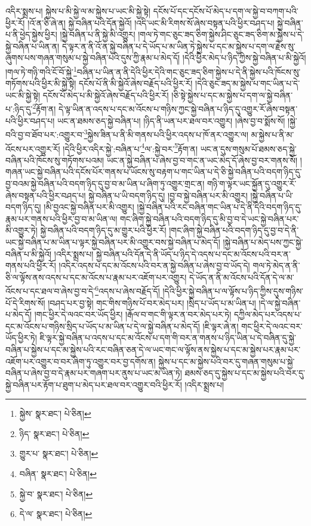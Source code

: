 འདིར་སྨྲས་པ། སྐྱེས་པ་མི་སྐྱེ་ལ་མ་སྐྱེས་པ་ཡང་མི་སྐྱེ་སྟེ། དངོས་པོ་དང་དངོས་པོ་མེད་པ་དག་ལ་སྐྱེ་བ་བཀག་པའི་ཕྱིར་རོ། །འོ་ན་ཅི་ཞེ་ན། སྐྱེ་བཞིན་པའི་དོན་སྐྱེའོ། །འདི་ཡང་མི་རིགས་སོ་ཞེས་བསྟན་པའི་ཕྱིར་བཤད་པ། སྐྱེ་བཞིན་པ་ནི་ཕྱེད་སྐྱེས་ཕྱིར། །སྐྱེ་བཞིན་པ་ནི་སྐྱེ་མི་འགྱུར། །གལ་ཏེ་གང་ཅུང་ཟད་ཅིག་སྐྱེས་ཤིང་ཅུང་ཟད་ཅིག་མ་སྐྱེས་པ་དེ་སྐྱེ་བཞིན་པ་ཡིན་ན། དེ་ལྟར་ན་ནི་འོ་ན་སྐྱེ་བཞིན་པ་དེ་ཡོད་པ་མ་ཡིན་ཏེ་སྐྱེས་པ་དང་མ་སྐྱེས་པ་དག་ལ་རྗེས་སུ་ཞུགས་པས་གཞན་གསུམ་པ་སྐྱེ་བཞིན་པའི་དུས་ཀྱི་རྣམ་པ་མེད་དོ། །དེའི་ཕྱིར་མེད་པ་ཉིད་ཀྱིས་སྐྱེ་བཞིན་པ་མི་སྐྱེའོ། །གལ་ཏེ་གཉི་གའི་ངོ་བོ་སྐྱེ་\footnote{སྐྱེས་  སྣར་ཐང་།  པེ་ཅིན། }བཞིན་པ་ཡིན་ན་ནི་དེའི་ཕྱིར་དེའི་གང་ཅུང་ཟད་ཅིག་སྐྱེས་པ་དེ་ནི་སྐྱེས་པའི་ཁོངས་སུ་གཏོགས་པའི་ཕྱིར་མི་སྐྱེ་སྟེ། དངོས་པོ་ནི་མི་སྐྱེའོ་ཞེས་བརྗོད་པའི་ཕྱིར་རོ། །དེའི་ཅུང་ཟད་མ་སྐྱེས་པ་གང་ཡིན་པ་དེ་ཡང་མི་སྐྱེ་སྟེ། དངོས་པོ་མེད་པ་མི་སྐྱེའོ་ཞེས་བརྗོད་པའི་ཕྱིར་རོ། །ཅི་སྟེ་སྐྱེས་པ་དང་མ་སྐྱེས་པ་དག་ལ་སྐྱེ་བཞིན་པ་:ཉིད་དུ་\footnote{ཉིད་  སྣར་ཐང་།  པེ་ཅིན། }རྟོག་ན། དེ་ལྟ་ཡིན་ན་འདས་པ་དང་མ་འོངས་པ་གཉིས་ཀྱང་སྐྱེ་བཞིན་པ་ཉིད་དུ་འགྱུར་རོ་ཞེས་བསྟན་པའི་ཕྱིར་བཤད་པ། ཡང་ན་ཐམས་ཅད་སྐྱེ་བཞིན་པ། །ཉིད་ནི་ཡན་པར་ཐལ་བར་འགྱུར། །ཞེས་བྱ་བ་སྨོས་སོ། །སྐྱེ་བའི་བྱ་བ་ཐོབ་པར་:འགྱུར་བ་\footnote{གྱུར་པ་  སྣར་ཐང་།  པེ་ཅིན། }སྐྱེས་ཟིན་པ་ནི་མི་གནས་པའི་ཕྱིར་འདས་པ་ཁོ་ནར་འགྱུར་ལ། མ་སྐྱེས་པ་ནི་མ་འོངས་པར་འགྱུར་རོ། །དེའི་ཕྱིར་འདིར་སྐྱེ་:བཞིན་པ་\footnote{བཞིན་  སྣར་ཐང་།  པེ་ཅིན། }ལ་:སྐྱེ་བར་\footnote{སྐྱེ་བ་  སྣར་ཐང་།  པེ་ཅིན། }རྟོག་ན། ཡང་ན་དུས་གསུམ་པོ་ཐམས་ཅད་སྐྱེ་བཞིན་པའི་ཁོངས་སུ་གཏོགས་པའམ། ཡང་ན་སྐྱེ་བཞིན་པ་ཞེས་བྱ་བ་གང་ན་ཡང་མེད་དོ་ཞེས་བྱ་བར་གནས་སོ། །གཞན་ཡང་སྐྱེ་བཞིན་པའི་དངོས་པོར་གནས་པ་ཡོངས་སུ་བརྟག་པ་གང་ཡིན་པ་དེ་ཅི་སྐྱེ་བཞིན་པའི་བདག་ཉིད་དུ་བྱ་བའམ་སྐྱེ་བཞིན་པའི་བདག་ཉིད་དུ་བྱ་བ་མ་ཡིན་པ་ཞིག་ཏུ་འགྱུར་གྲང་ན། གཉི་ག་ལྟར་ཡང་སྐྱོན་དུ་འགྱུར་རོ་ཞེས་བསྟན་པའི་ཕྱིར་བཤད་པ། སྐྱེ་བཞིན་པ་ཡི་བདག་ཉིད་དུ། །བྱ་བ་སྐྱེ་བཞིན་པར་མི་འགྱུར། །སྐྱེ་བཞིན་པ་ཡི་བདག་ཉིད་དུ། །མི་བྱའང་སྐྱེ་བཞིན་པར་མི་འགྱུར། །སྐྱེ་བཞིན་པའི་རང་བཞིན་གང་ཡིན་པ་དེ་ནི་དེའི་བདག་ཉིད་དུ་རྣམ་པར་གནས་པའི་ཕྱིར་བྱ་བ་མ་ཡིན་ལ། གང་ཞིག་སྐྱེ་བཞིན་པའི་བདག་ཉིད་དུ་མི་བྱ་བ་དེ་ཡང་སྐྱེ་བཞིན་པར་མི་འགྱུར་ཏེ། སྐྱེ་བཞིན་པའི་བདག་ཉིད་དུ་མ་གྱུར་པའི་ཕྱིར་རོ། །གང་ཞིག་སྐྱེ་བཞིན་པའི་བདག་ཉིད་དུ་བྱ་བ་དེ་ནི་ཡང་སྐྱེ་བཞིན་པ་མ་ཡིན་པ་ལྟར་སྐྱེ་བཞིན་པར་མི་འགྱུར་བས་སྐྱེ་བཞིན་པ་མེད་དོ། །སྐྱེ་བཞིན་པ་མེད་པས་ཀྱང་སྐྱེ་བཞིན་པ་མི་སྐྱེའོ། །འདིར་སྨྲས་པ། སྐྱེ་བཞིན་པའི་དོན་དེ་ནི་ཡོད་པ་ཉིད་དེ་འདས་པ་དང་མ་འོངས་པའི་བར་ན་གནས་པའི་ཕྱིར་རོ། །འདིར་འདས་པ་དང་མ་འོངས་པའི་བར་ན་སྐྱེ་བཞིན་པ་ཞེས་བྱ་བ་ཡོད་དེ། གལ་ཏེ་མེད་ན་ནི་ཅི་ལ་ལྟོས་ནས་འདས་པ་དང་མ་འོངས་པ་རྣམ་པར་འཇོག་པར་འགྱུར། དེ་ཡོད་ན་ནི་མ་འོངས་པའི་དོན་དེ་ལ་མ་འོངས་པ་དང་ཐལ་བ་ཞེས་བྱ་བ་དེ་\footnote{དེ་ལ་  སྣར་ཐང་།  པེ་ཅིན། }འདས་པ་ཞེས་བརྗོད་དོ། །དེའི་ཕྱིར་སྐྱེ་བཞིན་པ་ལ་ལྟོས་པ་ཉིད་ཀྱིས་དུས་གཉིས་པོ་དེ་རིགས་སོ། །བཤད་པར་བྱ་སྟེ། གང་གིས་གཉིས་པོ་བར་མེད་པར། །སྲིད་པ་ཡོད་པ་མ་ཡིན་པ། །དེ་ལ་སྐྱེ་བཞིན་པ་མེད་དོ། །གང་ཕྱིར་དེ་ལའང་བར་ཡོད་ཕྱིར། །རྒོལ་བ་གང་གི་ལྟར་ན་བར་མེད་པར་ཏེ། དཀྱིལ་མེད་པར་འདས་པ་དང་མ་འོངས་པ་གཉིས་སྲིད་པ་ཡོད་པ་མ་ཡིན་པ་དེ་ལ་སྐྱེ་བཞིན་པ་མེད་དོ། །ཇི་ལྟར་ཞེ་ན། གང་ཕྱིར་དེ་ལའང་བར་ཡོད་ཕྱིར་ཏེ། ཇི་ལྟར་སྐྱེ་བཞིན་པ་འདས་པ་དང་མ་འོངས་པ་དག་གི་བར་ན་གནས་པ་ཉིད་ཡིན་པ་དེ་བཞིན་དུ་སྐྱེ་བཞིན་པ་སྐྱེས་པ་དང་མ་སྐྱེས་པའི་རང་བཞིན་ཅན་དེ་ལ་ཡང་གང་ལ་ལྟོས་ནས་སྐྱེས་པ་དང་མ་སྐྱེས་པར་རྣམ་པར་འཇོག་པར་འགྱུར་བ་བར་ཞིག་ཏུ་འགྱུར་བར་བྱ་དགོས་ན། སྐྱེས་པ་དང་མ་སྐྱེས་པའི་བར་དུ་གཞན་གསུམ་པ་སྐྱེ་བཞིན་པ་ཞེས་བྱ་བ་དེ་རྣམ་པར་གཞག་པར་ནུས་པ་ཡང་མ་ཡིན་ཏེ། ཐམས་ཅད་དུ་སྐྱེས་པ་དང་མ་སྐྱེས་པའི་བར་དུ་སྐྱེ་བཞིན་པར་རྟོག་པ་ཐུག་པ་མེད་པར་ཐལ་བར་འགྱུར་བའི་ཕྱིར་རོ། །འདིར་སྨྲས་པ། 